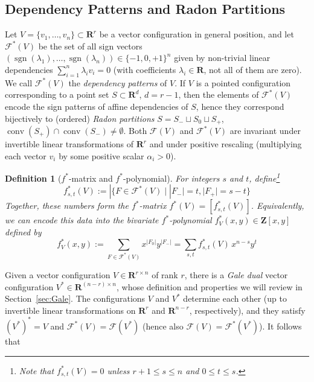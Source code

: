 \documentclass[11pt]{article}
\newtheorem{definition}[theorem]{Definition}
\DeclareMathOperator{\sgn}{sgn}
\DeclareMathOperator{\conv}{conv}
\renewcommand{\leq}{\leqslant}
\newcommand{\R}{\mathbf{R}}
\newcommand{\Z}{\mathbf{Z}}
\begin{document}
\subsection{Dependency Patterns and Radon Partitions}
Let $V = \{ v_1, \ldots, v_n \} \subset \R^r$ be a vector configuration in general position, and let $\mathcal{F}^*(V)$ be the set of all sign vectors $(\sgn(\lambda_1),\dots,\sgn(\lambda_n)) \in \{-1,0,+1\}^n$ given by non-trivial linear dependencies $\sum_{i=1}^n \lambda_i v_i=0$ (with coefficients $\lambda_i\in \R$, not all of them are zero). We call $\mathcal{F}^*(V)$ the \emph{dependency patterns} of $V$. If $V$ is a pointed configuration corresponding to a point set $S\subset \R^d$, $d=r-1$, then the elements of $\mathcal{F}^*(V)$ encode the sign patterns of affine dependencies of $S$, hence they correspond bijectively to (ordered) \emph{Radon partitions} $S=S_-\sqcup S_0 \sqcup S_+$, $\conv(S_+) \cap \conv(S_-)\neq \emptyset$. 
%
Both $\mathcal{F}(V)$ and $\mathcal{F}^*(V)$ are invariant under invertible linear transformations of $\R^r$ and under positive rescaling (multiplying each vector $v_i$ by some positive scalar $\alpha_i>0$).
%
%
%
\begin{definition}[$f^*$-matrix and $f^*$-polynomial] 
\label{def:fstar-poly}
For integers $s$ and $t$, define\footnote{Note that $f^*_{s,t}(V)=0$ unless $r+1\leq s\leq n$ and $0\leq t\leq s$.%
}
\[
f^*_{s,t}(V):=|\{F\in \mathcal{F}^*(V)\mid |F_-|=t, |F_+|=s-t\}
\]
Together, these numbers form the \emph{$f^*$-matrix} $f^*(V)=[f^*_{s,t}(V)]$. Equivalently, we can encode this data into the bivariate  \emph{$f^*$-polynomial} $f^*_V(x,y) \in \Z[x,y]$ defined by 
\[
f^*_{V}(x,y) := \sum_{F\in \mathcal{F}^*(V)} x^{|F_0|} y^{|F_-|} = \sum_{s,t} f^*_{s,t}(V)\, x^{n-s} y^t
\]
\end{definition}
%
Given a vector configuration $V \in \R^{r\times n}$ of rank $r$, there is a \emph{Gale dual} vector configuration $V^*  \in \R^{(n-r)\times n}$, whose definition and properties we will review in Section~\ref{sec:Gale}. The configurations $V$ and $V^*$ determine each other (up to invertible linear transformations on $\R^r$ and $\R^{n-r}$, respectively), and they satisfy 
$(V^*)^*=V$ and $\mathcal{F}^*(V)=\mathcal{F}(V^*)$ (hence also $\mathcal{F}(V)=\mathcal{F}^*(V^*)$). It follows that
\end{document}
